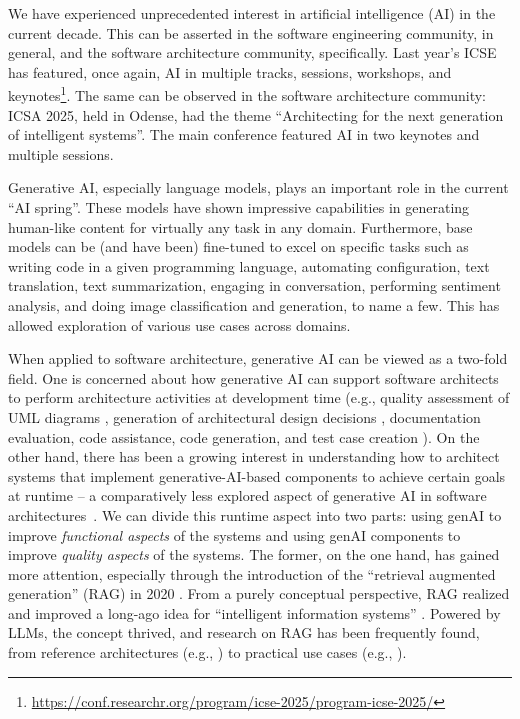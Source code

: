 \documentclass[sigconf]{acmart}
\theoremstyle{definition}
\begin{document}


We have experienced unprecedented interest in artificial intelligence (AI) in the current decade. This can be asserted in the software engineering community, in general, and the software architecture community, specifically. Last year's ICSE has featured, once again, AI in multiple tracks, sessions, workshops, and keynotes\footnote{\url{https://conf.researchr.org/program/icse-2025/program-icse-2025/}}. The same can be observed in the software architecture community: ICSA 2025, held in Odense, had the theme ``Architecting for the next generation of intelligent systems''. The main conference featured AI in two keynotes and multiple sessions.

Generative AI, especially language models, plays an important role in the current ``AI spring''. These models have shown impressive capabilities in generating human-like content for virtually any task in any domain. Furthermore, base models can be (and have been) fine-tuned to excel on specific tasks such as writing code in a given programming language, automating configuration, text translation, text summarization, engaging in conversation, performing sentiment analysis, and doing image classification and generation, to name a few. This has allowed exploration of various use cases across domains. %

When applied to software architecture, generative AI can be viewed as a two-fold field. One is concerned about how generative AI can support software architects to perform architecture activities at development time (e.g., quality assessment of UML diagrams \cite{de2025llm}, generation of architectural design decisions \cite{dhar2024can}, documentation evaluation, code assistance, code generation, and test case creation  \cite{jahic2024state}).
On the other hand, there has been a growing interest in understanding how to architect systems that implement generative-AI-based components to achieve certain goals at runtime -- a comparatively less explored aspect of generative AI in software architectures~\cite{esposito2025generative}. We can divide this runtime aspect into two parts: using genAI to improve \textit{functional aspects} of the systems and using genAI components to improve \textit{quality aspects} of the systems. The former, on the one hand, has gained more attention, especially through the introduction of the ``retrieval augmented generation'' (RAG) in 2020 \cite{lewis2020retrieval}. From a purely conceptual perspective, RAG realized and improved a long-ago idea for ``intelligent information systems'' \cite{lebowitz1983intelligent}. Powered by LLMs, the concept thrived, and research on RAG has been frequently found, from reference architectures (e.g., \cite{xu2025design}) to practical use cases (e.g., \cite{adnan2025leveraging}).
\end{document}
